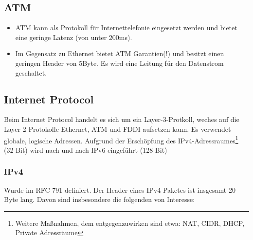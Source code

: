 \documentclass{article} %
\begin{document}
\subsection{ATM}
	\begin{itemize}
		\item ATM kann als Protokoll für Internettelefonie eingesetzt werden und bietet eine geringe Latenz (von unter 200ms).
		\item Im Gegensatz zu Ethernet bietet ATM Garantien(!) und besitzt einen geringen Header von 5Byte. Es wird eine Leitung für den Datenstrom geschaltet.
		
	\end{itemize}

\subsection{Internet Protocol}
\label{subsec:ip}
Beim Internet Protocol handelt es sich um ein Layer-3-Protkoll, weches auf die Layer-2-Protokolle Ethernet, ATM und FDDI aufsetzen kann.
Es verwendet globale, logische Adressen.
Aufgrund der Erschöpfung des IPv4-Adressraumes\footnote{Weitere Maßnahmen, dem entgegenzuwirken sind etwa: NAT, CIDR, DHCP, Private Adressräume} (32 Bit) wird nach und nach IPv6 eingeführt (128 Bit)

\subsubsection{IPv4}
Wurde im RFC 791\cite{rfc791} definiert.
Der Header eines IPv4 Paketes ist insgesamt 20 Byte lang.
Davon sind insbesondere die folgenden von Interesse:
\end{document}
